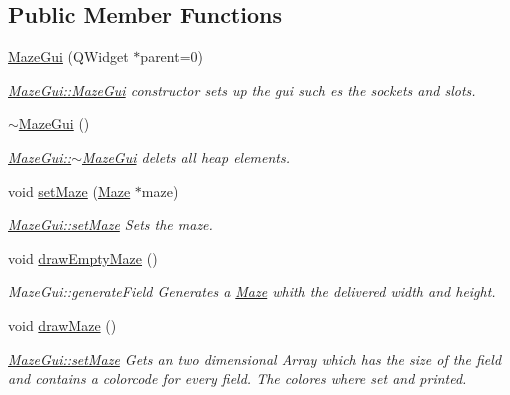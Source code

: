 \subsection*{Public Member Functions}
\begin{DoxyCompactItemize}
\item 
\hyperlink{class_maze_gui_aea46561b3539431d4c71515cb50ec530}{Maze\-Gui} (Q\-Widget $\ast$parent=0)
\begin{DoxyCompactList}\small\item\em \hyperlink{class_maze_gui_aea46561b3539431d4c71515cb50ec530}{Maze\-Gui\-::\-Maze\-Gui} constructor sets up the gui such es the sockets and slots. \end{DoxyCompactList}\item 
\hyperlink{class_maze_gui_af230996793f8246cd6f50f5c69ac2a79}{$\sim$\-Maze\-Gui} ()
\begin{DoxyCompactList}\small\item\em \hyperlink{class_maze_gui_af230996793f8246cd6f50f5c69ac2a79}{Maze\-Gui\-::$\sim$\-Maze\-Gui} delets all heap elements. \end{DoxyCompactList}\item 
void \hyperlink{class_maze_gui_a5bcc8fc361cc77fd741c690775bf5a04}{set\-Maze} (\hyperlink{class_maze}{Maze} $\ast$maze)
\begin{DoxyCompactList}\small\item\em \hyperlink{class_maze_gui_a5bcc8fc361cc77fd741c690775bf5a04}{Maze\-Gui\-::set\-Maze} Sets the maze. \end{DoxyCompactList}\item 
void \hyperlink{class_maze_gui_a42bc86307a9cfecf3f42084a0dabdfb3}{draw\-Empty\-Maze} ()
\begin{DoxyCompactList}\small\item\em Maze\-Gui\-::generate\-Field Generates a \hyperlink{class_maze}{Maze} whith the delivered width and height. \end{DoxyCompactList}\item 
void \hyperlink{class_maze_gui_ab6a12bf649ff8a9adf48696626f5c2a4}{draw\-Maze} ()
\begin{DoxyCompactList}\small\item\em \hyperlink{class_maze_gui_a5bcc8fc361cc77fd741c690775bf5a04}{Maze\-Gui\-::set\-Maze} Gets an two dimensional Array which has the size of the field and contains a colorcode for every field. The colores where set and printed. \end{DoxyCompactList}\end{DoxyCompactItemize}


